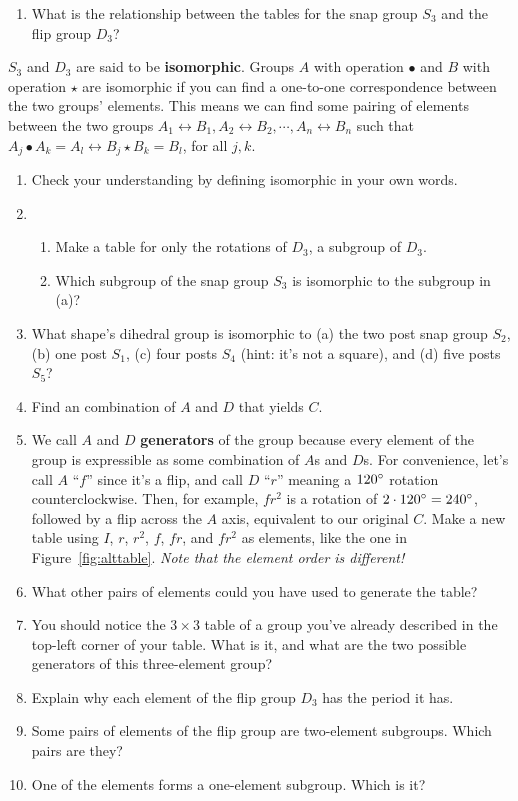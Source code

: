\documentclass[../gatm.tex]{subfiles}
\begin{document}
%
\begin{enumerate}
\setcounter{enumi}{\theenumLast}
\item What is the relationship between the tables for the snap group $S_3$ and the flip group $D_3$?
\setcounter{enumLast}{\theenumi}
\end{enumerate}
$S_3$ and $D_3$ are said to be \textbf{isomorphic}. Groups $A$ with operation $\bullet$ and $B$ with operation $\star$ are isomorphic if you can find a one-to-one correspondence between the two groups' elements. This means we can find some pairing of elements between the two groups $A_1\leftrightarrow B_1, A_2\leftrightarrow B_2, \cdots, A_n \leftrightarrow B_n$ such that $A_j \bullet A_k = A_l \leftrightarrow B_j \star B_k = B_l$, for all $j,k$.
\begin{enumerate}
\setcounter{enumi}{\theenumLast}
\item Check your understanding by defining isomorphic in your own words.
\item \begin{enumerate}
\item Make a table for only the rotations of $D_3$, a subgroup of $D_3$.
\item Which subgroup of the snap group $S_3$ is isomorphic to the subgroup in (a)?
\end{enumerate}
\item What shape's dihedral group is isomorphic to (a) the two post snap group $S_2$, (b) one post $S_1$, (c) four posts $S_4$ (hint: it's not a square), and (d) five posts $S_5$?
\item Find an combination of $A$ and $D$ that yields $C$.
\item We call $A$ and $D$ \textbf{generators} of the group because every element of the group is expressible as some combination of $A$s and $D$s. For convenience, let's call $A$ ``$f$'' since it's a flip, and call $D$ ``$r$'' meaning a $120^\circ$ rotation counterclockwise. Then, for example, $fr^2$ is a rotation of $2\cdot 120^\circ = 240^\circ$, followed by a flip across the $A$ axis, equivalent to our original $C$. Make a new table using $I$, $r$, $r^2$, $f$, $fr$, and $fr^2$ as elements, like the one in Figure~\ref{fig:alttable}. \textit{Note that the element order is different!}
\item What other pairs of elements could you have used to generate the table?
\item You should notice the $3\times 3$ table of a group you've already described in the top-left corner of your table. What is it, and what are the two possible generators of this three-element group?
\item Explain why each element of the flip group $D_3$ has the period it has.
\item Some pairs of elements of the flip group are two-element subgroups. Which pairs are they?
\item One of the elements forms a one-element subgroup. Which is it?
\setcounter{enumLast}{\theenumi}
\end{enumerate}
\end{document}
